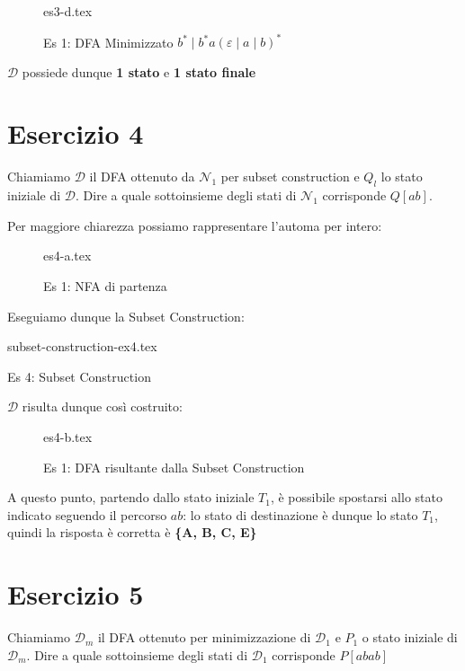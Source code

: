 \documentclass[class=book, crop=false, oneside, 12pt]{standalone}
\begin{document}
\begin{figure}[H]
	\centering
    {es3-d.tex}
    \caption{Es 1: DFA Minimizzato \(b^* \mid b^* a (\varepsilon \mid a \mid b)^*\)}
    \label{fig:dfa-minimized-ex3}
\end{figure}

\(\mathcal{D}\) possiede dunque \textbf{1 stato} e \textbf{1 stato finale}

\section*{Esercizio 4}

Chiamiamo \(\mathcal{D}\) il DFA ottenuto da \(\mathcal{N}_1\) per subset construction e \(Q_l\) lo stato iniziale di \(\mathcal{D}\).  Dire a quale sottoinsieme degli stati di \(\mathcal{N}_1\) corrisponde \(Q[ab]\).

Per maggiore chiarezza possiamo rappresentare l'automa per intero:

\begin{figure}[H]
	\centering
    {es4-a.tex}
    \caption{Es 1: NFA di partenza}
    \label{fig:nfa-ex4}
\end{figure}

Eseguiamo dunque la Subset Construction:

\begin{table}[H]
    \centering
    {subset-construction-ex4.tex}
    \caption{Es 4: Subset Construction}
    \label{tab:subset-construction-ex4}
\end{table}

\(\mathcal{D}\) risulta dunque così costruito:

\begin{figure}[H]
	\centering
    {es4-b.tex}
    \caption{Es 1: DFA risultante dalla Subset Construction}
    \label{fig:sc-ex4}
\end{figure}

A questo punto, partendo dallo stato iniziale \(T_1\), è possibile spostarsi allo stato indicato seguendo il percorso \(ab\): lo stato di destinazione è dunque lo stato \(T_1\), quindi la risposta è corretta è \textbf{\{A, B, C, E\}}

\section*{Esercizio 5}

Chiamiamo \(\mathcal{D}_m\) il  DFA  ottenuto  per  minimizzazione  di \(\mathcal{D}_1\) e \(P_1\) o  stato  iniziale  di \(\mathcal{D}_m\). Dire a quale sottoinsieme degli stati di \(\mathcal{D}_1\) corrisponde \(P[abab]\)
\end{document}

